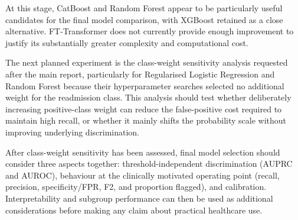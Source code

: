 \documentclass[11pt,a4paper]{article}
\begin{document}
At this stage, CatBoost and Random Forest appear to be particularly useful candidates for the final model comparison, with XGBoost retained as a close alternative. FT-Transformer does not currently provide enough improvement to justify its substantially greater complexity and computational cost.

The next planned experiment is the class-weight sensitivity analysis requested after the main report, particularly for Regularised Logistic Regression and Random Forest because their hyperparameter searches selected no additional weight for the readmission class. This analysis should test whether deliberately increasing positive-class weight can reduce the false-positive cost required to maintain high recall, or whether it mainly shifts the probability scale without improving underlying discrimination.

After class-weight sensitivity has been assessed, final model selection should consider three aspects together: threshold-independent discrimination (AUPRC and AUROC), behaviour at the clinically motivated operating point (recall, precision, specificity/FPR, F2, and proportion flagged), and calibration. Interpretability and subgroup performance can then be used as additional considerations before making any claim about practical healthcare use.
\end{document}
